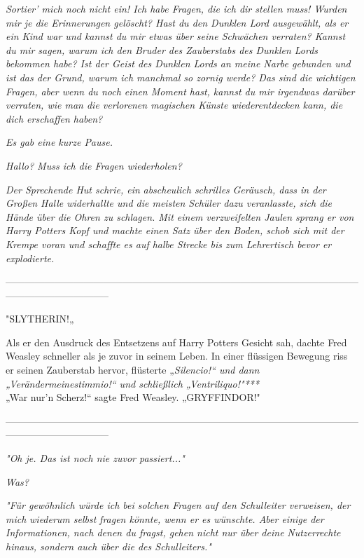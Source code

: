 {\hfill\break \emph{\emph{Sortier' mich noch nicht ein! Ich habe Fragen, die ich dir stellen muss! Wurden mir je die Erinnerungen gelöscht? Hast du den Dunklen Lord ausgewählt, als er ein Kind war und kannst du mir etwas über seine Schwächen verraten? Kannst du mir sagen, warum ich den Bruder des Zauberstabs des Dunklen Lords bekommen habe? Ist der Geist des Dunklen Lords an meine Narbe gebunden und ist das der Grund, warum ich manchmal so zornig werde? Das sind die wichtigen Fragen, aber wenn du noch einen Moment hast, kannst du mir irgendwas darüber verraten, wie man die verlorenen magischen Künste wiederentdecken kann, die dich erschaffen haben?}}

\emph{Es gab eine kurze Pause.}

\emph{\emph{Hallo? Muss ich die Fragen wiederholen?}}

\emph{Der Sprechende Hut schrie, ein} \emph{abscheulich schrilles} \emph{Geräusch, dass in der Großen Halle widerhallte und die meisten Schüler dazu veranlasste, sich die Hände über die Ohren zu schlagen. Mit einem verzweifelten Jaulen sprang er von Harry Potters Kopf und machte einen Satz über den Boden, schob sich mit der Krempe voran und schaffte es auf halbe Strecke bis zum Lehrertisch bevor er explodierte.}

--------------------------------------------------------------------------------------------------------------------------------------------

\hfill\break "SLYTHERIN!„

Als er den Ausdruck des Entsetzens auf Harry Potters Gesicht sah, dachte Fred Weasley schneller als je zuvor in seinem Leben. In einer flüssigen Bewegung riss er seinen Zauberstab hervor, flüsterte „\emph{Silencio!“ und dann „\emph{Verändermeinestimmio!}“ und schließlich „\emph{Ventriliquo!}"***}\\ „War nur'n Scherz!“ sagte Fred Weasley. „GRYFFINDOR!"

--------------------------------------------------------------------------------------------------------------------------------------------

\hfill\break \emph{"\emph{Oh je. Das ist noch nie zuvor passiert...}"}

\emph{\emph{Was?}}

\emph{"\emph{Für gewöhnlich würde ich bei solchen Fragen auf den Schulleiter verweisen, der mich}} \emph{\emph{wiederum selbst}} \emph{\emph{fragen könnte, wenn er es wünschte. Aber einige der Informationen, nach denen du fragst, gehen nicht nur über dein}\emph{e}} \emph{\emph{Nutzer}\emph{rechte}} \emph{\emph{hinaus, sondern auch über die des Schulleiters.}"}

}
